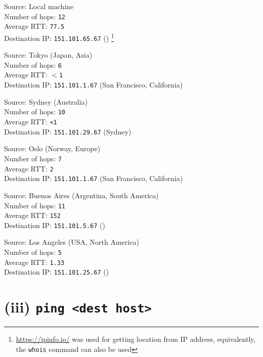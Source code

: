 \documentclass[11pt, fleqn]{article}
\begin{document}
Source: Local machine\\
Number of hops: \texttt{12}\\
Average RTT: \texttt{77.5}\\
Destination IP: \texttt{151.101.65.67} () \footnote{\url{https://ipinfo.io/} was used for getting location from IP address, equivalently, the \texttt{whois} command can also be used}

\hrulefill
\smallskip

Source: Tokyo (Japan, Asia)\\
Number of hops: \texttt{6}\\
Average RTT: $<$\texttt{1}\\
Destination IP: \texttt{151.101.1.67} (San Francisco, California)

\hrulefill
\smallskip

Source: Sydney (Australia)\\
Number of hops: \texttt{10}\\
Average RTT: \texttt{<1}\\
Destination IP: \texttt{151.101.29.67} (Sydney)

\hrulefill
\smallskip

Source: Oslo (Norway, Europe)\\
Number of hops: \texttt{7}\\
Average RTT: \texttt{2}\\
Destination IP: \texttt{151.101.1.67} (San Francisco, California)

\hrulefill
\smallskip

Source: Buenos Aires (Argentina, South America)\\
Number of hops: \texttt{11}\\
Average RTT: \texttt{152}\\
Destination IP: \texttt{151.101.5.67} ()

\hrulefill
\smallskip

Source: Los Angeles (USA, North America)\\
Number of hops: \texttt{5}\\
Average RTT: \texttt{1.33}\\
Destination IP: \texttt{151.101.25.67} ()

\hrulefill


\newpage
\section*{(iii) \texttt{ping <dest host>}}
\label{partc}
\setcounter{equation}{0}
\end{document}
